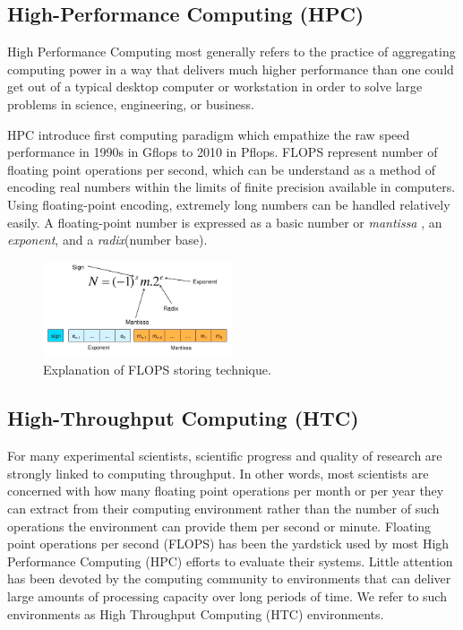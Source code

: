 \documentclass[12pt]{report}
\begin{document}
	\subsection{High-Performance Computing (HPC)}
    	High Performance Computing most generally refers to the practice of aggregating computing power in a way that delivers much higher performance than one could get out of a typical desktop computer or workstation in order to solve large problems in science, engineering, or business.
    	
        HPC introduce first computing paradigm which empathize the raw speed performance in 1990s in Gflops to 2010  in Pflops. FLOPS represent number of floating point operations per second, which can be understand as a method of encoding real numbers within the limits of finite precision available in computers. Using floating-point encoding, extremely long numbers can be handled relatively easily. A floating-point number is expressed as a basic number or \textit{mantissa} , an \textit{exponent}, and a \textit{radix}(number base).
    
\begin{figure}[ht]
\centering
     \includegraphics[width=0.5\textwidth]{img2.png}
      \caption{Explanation of FLOPS storing technique.}
       \label{img2}
\end{figure}    
            
    \subsection{High-Throughput Computing (HTC)}
	For many experimental scientists, scientific progress and quality of research are strongly linked to computing throughput. In other words, most scientists are concerned with how many floating point operations per month or per year they can extract from their computing environment rather than the number of such operations the environment can provide them per second or minute. Floating point operations per second (FLOPS) has been the yardstick used by most High Performance Computing (HPC) efforts to evaluate their systems. Little attention has been devoted by the computing community to environments that can deliver large amounts of processing capacity over long periods of time. We refer to such environments as High Throughput Computing (HTC) environments.\cite{htcondor}
\end{document}
